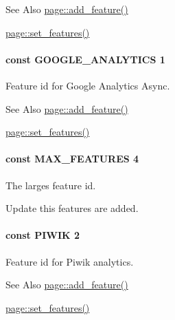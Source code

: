 \begin{DoxySeeAlso}{See Also}
\hyperlink{classpage_a417d01aff00de8193f7f9f6a9eac8635}{page\-::add\-\_\-feature()} 

\hyperlink{classpage_a17f91936047fb8ba40b8dff21d5b2f55}{page\-::set\-\_\-features()} 
\end{DoxySeeAlso}
\hypertarget{page_8inc_8php_acf6eb59f99bc3d667079a97d04b06a8d}{
\paragraph[{G\-O\-O\-G\-L\-E\-\_\-\-A\-N\-A\-L\-Y\-T\-I\-C\-S}]{\setlength{\rightskip}{0pt plus 5cm}const G\-O\-O\-G\-L\-E\-\_\-\-A\-N\-A\-L\-Y\-T\-I\-C\-S 1}}\label{page_8inc_8php_acf6eb59f99bc3d667079a97d04b06a8d}


Feature id for Google Analytics Async. 

\begin{DoxySeeAlso}{See Also}
\hyperlink{classpage_a417d01aff00de8193f7f9f6a9eac8635}{page\-::add\-\_\-feature()} 

\hyperlink{classpage_a17f91936047fb8ba40b8dff21d5b2f55}{page\-::set\-\_\-features()} 
\end{DoxySeeAlso}
\hypertarget{page_8inc_8php_a15133b567c1ea5426e5e374d7bf82373}{
\paragraph[{M\-A\-X\-\_\-\-F\-E\-A\-T\-U\-R\-E\-S}]{\setlength{\rightskip}{0pt plus 5cm}const M\-A\-X\-\_\-\-F\-E\-A\-T\-U\-R\-E\-S 4}}\label{page_8inc_8php_a15133b567c1ea5426e5e374d7bf82373}


The larges feature id. 

Update this features are added. \hypertarget{page_8inc_8php_a0253c636b6a675cb40bfe52b6448970a}{
\paragraph[{P\-I\-W\-I\-K}]{\setlength{\rightskip}{0pt plus 5cm}const P\-I\-W\-I\-K 2}}\label{page_8inc_8php_a0253c636b6a675cb40bfe52b6448970a}


Feature id for Piwik analytics. 

\begin{DoxySeeAlso}{See Also}
\hyperlink{classpage_a417d01aff00de8193f7f9f6a9eac8635}{page\-::add\-\_\-feature()} 

\hyperlink{classpage_a17f91936047fb8ba40b8dff21d5b2f55}{page\-::set\-\_\-features()} 
\end{DoxySeeAlso}
